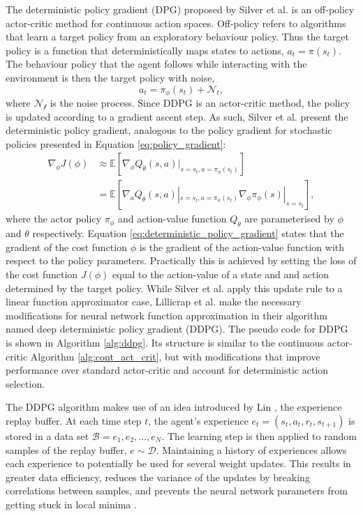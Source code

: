 The deterministic policy gradient (DPG) proposed by Silver et al. \cite{silver2014} is an off-policy actor-critic method for continuous action spaces. 
Off-policy refers to algorithms that learn a target policy from an exploratory behaviour policy. 
Thus the target policy is a function that deterministically maps states to actions, $a_t = \pi(s_t)$.
The behaviour policy that the agent follows while interacting with the environment is then the target policy with noise, 
\begin{equation}
    a_t = \pi_{\phi}(s_t) + \mathcal{N}_t,
\end{equation}
where $\mathcal{N_t}$ is the noise process.
Since DDPG is an actor-critic method, the policy is updated according to a gradient ascent step. 
As such, Silver et al. \cite{silver2014} present the deterministic policy gradient, analogous to the policy gradient for stochastic policies presented in Equation \ref{eq:policy_gradient}:
\begin{equation}
\begin{split}
    \nabla_{\phi} J(\phi) &\approx \mathbb{E}[ \nabla_{\phi} Q_{\theta}(s,a) |_{s=s_t, a=\pi_{\phi}(s_t)}]\\
    &= \mathbb{E} [ \nabla_{a} Q_{\theta}(s,a)|_{s=s_t, a=\pi_{\phi}(s_t)} \nabla_{\phi} \pi_{\phi}(s)|_{s=s_t}],
    \label{eq:deterministic_policy_gradient}
    \end{split}
\end{equation}
where the actor policy $\pi_{\phi}$ and action-value function $Q_{\theta}$ are parameterised by $\phi$ and $\theta$ respectively. Equation \ref{eq:deterministic_policy_gradient} states that the gradient of the cost function $\phi$ is the gradient of the action-value function with respect to the policy parameters. Practically this is achieved by setting the loss of the cost function $J(\phi)$ equal to the action-value of a state and and action determined by the target policy.
While Silver et al. \cite{silver2014} apply this update rule to a linear function approximator case, Lillicrap et al. \cite{Lillicrap2016} make the necessary modifications for neural network function approximation in their algorithm named deep deterministic policy gradient (DDPG). 
The pseudo code for DDPG is shown in Algorithm \ref{alg:ddpg}. 
Its structure is similar to the continuous actor-critic Algorithm \ref{alg:cont_act_crit}, but with modifications that improve performance over standard actor-critic and account for deterministic action selection.

The DDPG algorithm makes use of an idea introduced by Lin \cite{lin1993}, the experience replay buffer. At each time step $t$, the agent's experience $e_t = (s_t,a_t,r_t,s_{t+1})$ is stored in a data set $\mathcal{B} = e_1, e_2, ... , e_N$. 
The learning step is then applied to random samples of the replay buffer, $e \sim \mathcal{D}$. 
Maintaining a history of experiences allows each experience to potentially be used for several weight updates.
This results in greater data efficiency, reduces the variance of the updates by breaking correlations between samples, and prevents the neural network parameters from getting stuck in local minima \cite{mnih2013}.

